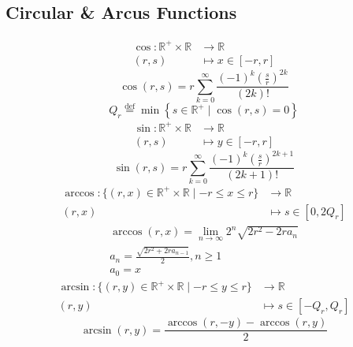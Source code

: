 \documentclass[a4paper,12pt]{report}
\begin{document}
\subsection{Circular \& Arcus Functions}
\begin{equation}
\begin{aligned}
\cos \colon \mathbb{R}^{+} \times \mathbb{R} & \to \mathbb{R} \\
(r,s) & \mapsto x \in [-r,r]
\end{aligned}
\end{equation}
\begin{equation}
\cos(r,s) = r \sum \limits_{k=0}^{\infty} \frac{(-1)^k \left(\frac{s}{r}\right)^{2k}}{(2k)!}
\end{equation}
\begin{equation}
Q_r \stackrel{\text{def}}{=} \min \left\{s \in \mathbb{R}^+ \mid \cos(r,s) = 0\right\}
\end{equation}
\begin{equation}
\begin{aligned}
\sin \colon \mathbb{R}^{+} \times \mathbb{R} & \to \mathbb{R} \\
(r,s) & \mapsto y \in [-r,r]
\end{aligned}
\end{equation}
\begin{equation}
\sin(r,s) = r \sum \limits_{k=0}^{\infty} \frac{(-1)^k \left(\frac{s}{r}\right)^{2k+1}}{(2k+1)!}
\end{equation}
\begin{equation}
\begin{aligned}
\arccos \colon \{(r,x) \in \mathbb{R}^{+} \times \mathbb{R} \mid -r \leq x \leq r\} & \to \mathbb{R} \\
(r,x) & \mapsto s \in \left[0, 2Q_r\right]
\end{aligned}
\end{equation}
\begin{subequations}
\begin{gather}
\arccos(r,x) = \lim \limits_{n \to \infty} 2^n \sqrt{2r^2 - 2ra_n} \\
a_n = \frac{\sqrt{2r^2 + 2ra_{n-1}}}{2}, n \geq 1 \\
a_0 = x
\end{gather}
\end{subequations}
\begin{equation}
\begin{aligned}
\arcsin \colon \{(r,y) \in \mathbb{R}^{+} \times \mathbb{R} \mid -r \leq y \leq r\} & \to \mathbb{R} \\
(r,y) & \mapsto s \in \left[-Q_r, Q_r\right]
\end{aligned}
\end{equation}
\begin{equation}
\arcsin(r,y) = \frac{\arccos(r,-y) - \arccos(r,y)}{2}
\end{equation}
\end{document}
